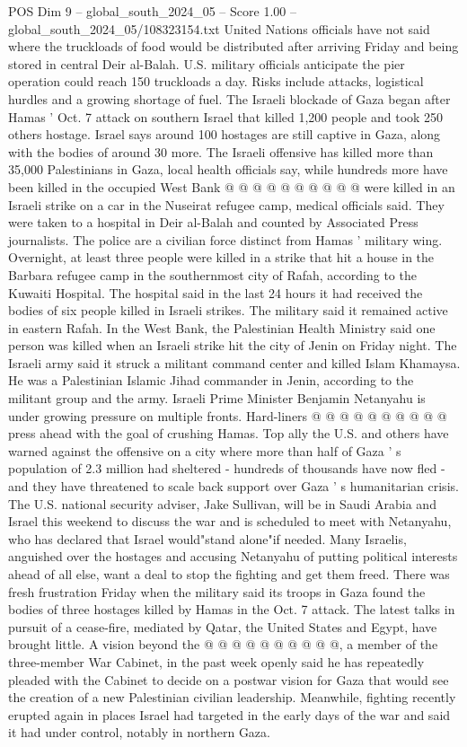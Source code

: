 \begin{textsample}{POS Dim 9 – global\_south\_2024\_05 – Score 1.00 – global\_south\_2024\_05/108323154.txt}
United Nations officials have not said where the truckloads of food would be distributed after arriving Friday and being stored in central Deir al-Balah.
U.S. military officials anticipate the pier operation could reach 150 truckloads a day.
Risks include attacks, logistical hurdles and a growing shortage of fuel.
The Israeli blockade of Gaza began after Hamas ' Oct. 7 attack on southern Israel that killed 1,200 people and took 250 others hostage.
Israel says around 100 hostages are still captive in Gaza, along with the bodies of around 30 more.
The Israeli offensive has killed more than 35,000 Palestinians in Gaza, local health officials say, while hundreds more have been killed in the occupied West Bank @ @ @ @ @ @ @ @ @ @ were killed in an Israeli strike on a car in the Nuseirat refugee camp, medical officials said.
They were taken to a hospital in Deir al-Balah and counted by Associated Press journalists.
The police are a civilian force distinct from Hamas ' military wing.
Overnight, at least three people were killed in a strike that hit a house in the Barbara refugee camp in the southernmost city of Rafah, according to the Kuwaiti Hospital.
The hospital said in the last 24 hours it had received the bodies of six people killed in Israeli strikes.
The military said it remained active in eastern Rafah.
In the West Bank, the Palestinian Health Ministry said one person was killed when an Israeli strike hit the city of Jenin on Friday night.
The Israeli army said it struck a militant command center and killed Islam Khamaysa.
He was a Palestinian Islamic Jihad commander in Jenin, according to the militant group and the army.
Israeli Prime Minister Benjamin Netanyahu is under growing pressure on multiple fronts.
Hard-liners @ @ @ @ @ @ @ @ @ @ press ahead with the goal of crushing Hamas.
Top ally the U.S. and others have warned against the offensive on a city where more than half of Gaza ' s population of 2.3 million had sheltered - hundreds of thousands have now fled - and they have threatened to scale back support over Gaza ' s humanitarian crisis.
The U.S. national security adviser, Jake Sullivan, will be in Saudi Arabia and Israel this weekend to discuss the war and is scheduled to meet with Netanyahu, who has declared that Israel would"stand alone"if needed.
Many Israelis, anguished over the hostages and accusing Netanyahu of putting political interests ahead of all else, want a deal to stop the fighting and get them freed.
There was fresh frustration Friday when the military said its troops in Gaza found the bodies of three hostages killed by Hamas in the Oct. 7 attack.
The latest talks in pursuit of a cease-fire, mediated by Qatar, the United States and Egypt, have brought little.
A vision beyond the @ @ @ @ @ @ @ @ @ @, a member of the three-member War Cabinet, in the past week openly said he has repeatedly pleaded with the Cabinet to decide on a postwar vision for Gaza that would see the creation of a new Palestinian civilian leadership.
Meanwhile, fighting recently erupted again in places Israel had targeted in the early days of the war and said it had under control, notably in northern Gaza.

\end{textsample}
